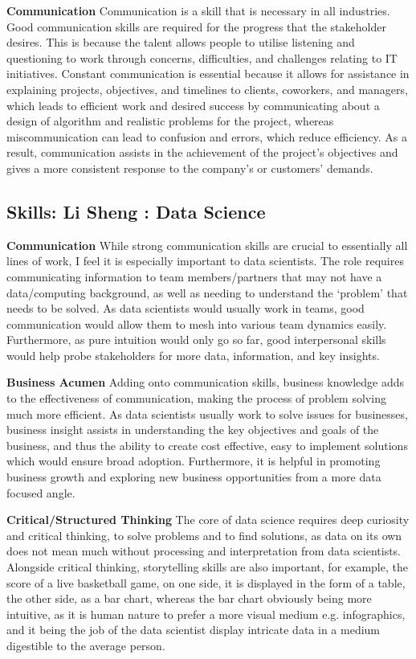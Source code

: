 \documentclass[a4paper, 11pt]{report}
\begin{document}
\textbf{Communication}
Communication is a skill that is necessary in all industries. Good communication skills are required for the progress that the stakeholder desires. This is because the talent allows people to utilise listening and questioning to work through concerns, difficulties, and challenges relating to IT initiatives. Constant communication is essential because it allows for assistance in explaining projects, objectives, and timelines to clients, coworkers, and managers, which leads to efficient work and desired success by communicating about a design of algorithm and realistic problems for the project, whereas miscommunication can lead to confusion and errors, which reduce efficiency. As a result, communication assists in the achievement of the project's objectives and gives a more consistent response to the company's or customers' demands.


\subsection{Skills: Li Sheng : Data Science}


\textbf{Communication}
While strong communication skills are crucial to essentially all lines of work, I feel it is especially important to data scientists. The role requires communicating information to team members/partners that may not have a data/computing background, as well as needing to understand the ‘problem’ that needs to be solved. As data scientists would usually work in teams, good communication would allow them to mesh into various team dynamics easily. Furthermore, as pure intuition would only go so far, good interpersonal skills would help probe stakeholders for more data, information, and key insights.

\textbf{Business Acumen}
Adding onto communication skills, business knowledge adds to the effectiveness of communication, making the process of problem solving much more efficient. As data scientists usually work to solve issues for businesses, business insight assists in understanding the key objectives and goals of the business, and thus the ability to create cost effective, easy to implement solutions which would ensure broad adoption. Furthermore, it is helpful in promoting business growth and exploring new business opportunities from a more data focused angle.

\textbf{Critical/Structured Thinking}
The core of data science requires deep curiosity and critical thinking, to solve problems and to find solutions, as data on its own does not mean much without processing and interpretation from data scientists. Alongside critical thinking, storytelling skills are also important, for example, the score of a live basketball game, on one side, it is displayed in the form of a table, the other side, as a bar chart, whereas the bar chart obviously being more intuitive, as it is human nature to prefer a more visual medium e.g. infographics, and it being the job of the data scientist display intricate data in a medium digestible to the average person.
\end{document}
